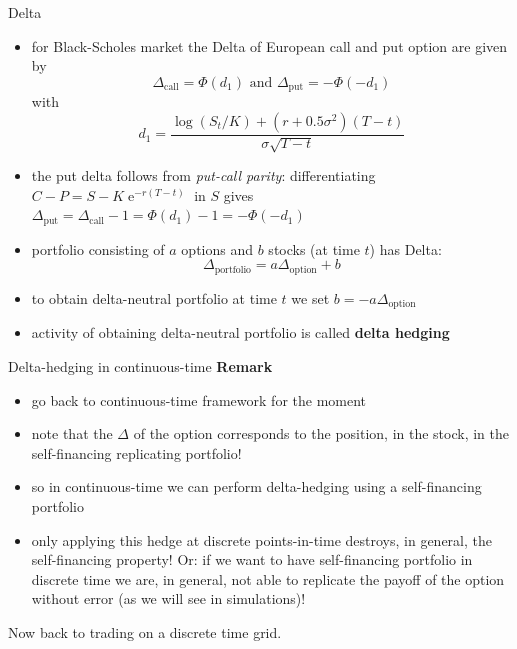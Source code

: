 \documentclass[pdf, handout]{beamer}
\newcommand{\e}{\operatorname{e}}
\begin{document}
\begin{frame}{Delta}
\begin{itemize}
\item for Black-Scholes market the Delta of European call and put option are given by
\[
\Delta_{\text{call}} = \Phi(d_1) \text{  and } 
\Delta_{\text{put}} = -\Phi(-d_1)
 \]
with
\[
d_1= \frac{
\log(S_t/K)+(r +0.5 \sigma^2)(T-t)}{\sigma\sqrt{T-t}}
\]
\item the put delta follows from \emph{put-call parity}: differentiating $C-P=S-K\e^{-r(T-t)}$ in $S$ gives $\Delta_{\text{put}}=\Delta_{\text{call}}-1=\Phi(d_1)-1=-\Phi(-d_1)$
\item portfolio consisting of $a$ options and $b$ stocks (at time $t$) has Delta:
\[
\Delta_{\text{portfolio}} = a \Delta_{\text{option}}
+ b  
\]
\item to obtain delta-neutral portfolio at time $t$ we 
set $b = - a \Delta_{\text{option}}$
\item activity of obtaining delta-neutral portfolio
is called \textbf{delta hedging}
\end{itemize}
\end{frame}

\begin{frame}{Delta-hedging in continuous-time}
\textbf{Remark}
\begin{itemize}
\item go back to continuous-time framework for the moment
\item note that the $\Delta$ of the option corresponds to the
position, in the stock, in the self-financing replicating portfolio!
\item so in continuous-time we can perform delta-hedging using
a self-financing portfolio
\item only applying this hedge at discrete points-in-time
destroys, in general, the self-financing property! Or: if we want to have 
self-financing portfolio in discrete time we are, in general, not able
to replicate the payoff of the option without error
(as we will see in simulations)!
\end{itemize}
Now back to trading on a discrete time grid.
\end{frame}
\end{document}
